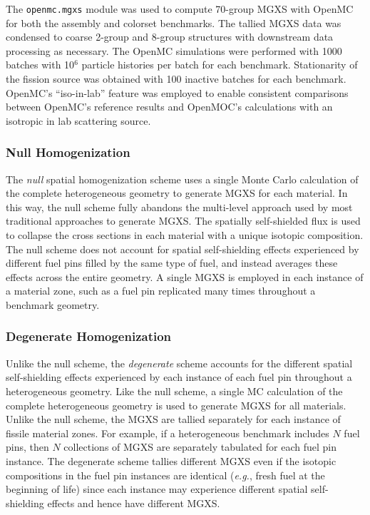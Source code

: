 The \texttt{openmc.mgxs} module was used to compute 70-group MGXS with OpenMC for both the assembly and colorset benchmarks. The tallied MGXS data was condensed to coarse 2-group and 8-group structures with downstream data processing as necessary. The OpenMC simulations were performed with 1000 batches with 10$^{6}$ particle histories per batch for each benchmark. Stationarity of the fission source was obtained with 100 inactive batches for each benchmark. OpenMC's ``iso-in-lab'' feature was employed to enable consistent comparisons between OpenMC's reference results and OpenMOC's calculations with an isotropic in lab scattering source.

\subsubsection{Null Homogenization}
\label{subsubsec:homogenize-null}

The \textit{null} spatial homogenization scheme uses a single Monte Carlo calculation of the complete heterogeneous geometry to generate MGXS for each material. In this way, the null scheme fully abandons the multi-level approach used by most traditional approaches to generate MGXS. The spatially self-shielded flux is used to collapse the cross sections in each material with a unique isotopic composition. The null scheme does not account for spatial self-shielding effects experienced by different fuel pins filled by the same type of fuel, and instead averages these effects across the entire geometry. A single MGXS is employed in each instance of a material zone, such as a fuel pin replicated many times throughout a benchmark geometry.

\subsubsection{Degenerate Homogenization}
\label{subsubsec:homogenize-degenerate}

Unlike the null scheme, the \textit{degenerate} scheme accounts for the different spatial self-shielding effects experienced by each instance of each fuel pin throughout a heterogeneous geometry. Like the null scheme, a single MC calculation of the complete heterogeneous geometry is used to generate MGXS for all materials. Unlike the null scheme, the MGXS are tallied separately for each instance of fissile material zones. For example, if a heterogeneous benchmark includes $N$ fuel pins, then $N$ collections of MGXS are separately tabulated for each fuel pin instance. The degenerate scheme tallies different MGXS even if the isotopic compositions in the fuel pin instances are identical (\textit{e.g.}, fresh fuel at the beginning of life) since each instance may experience different spatial self-shielding effects and hence have different MGXS.

